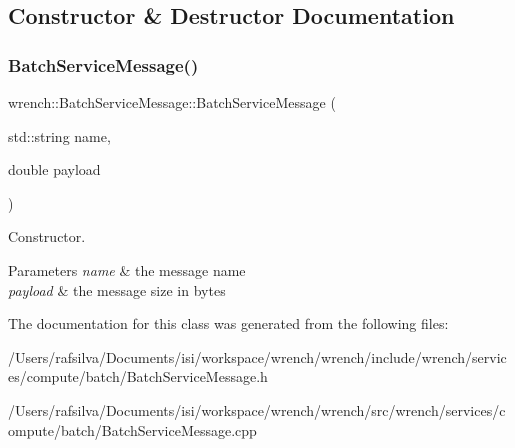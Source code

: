 \subsection{Constructor \& Destructor Documentation}
\mbox{\label{classwrench_1_1_batch_service_message_ab41ad2c88e84ccf1335f364fd3beb7c9}} 
\subsubsection{\texorpdfstring{Batch\+Service\+Message()}{BatchServiceMessage()}}
{\footnotesize\ttfamily wrench\+::\+Batch\+Service\+Message\+::\+Batch\+Service\+Message (\begin{DoxyParamCaption}\item[{std\+::string}]{name,  }\item[{double}]{payload }\end{DoxyParamCaption})\hspace{0.3cm}{\ttfamily [protected]}}



Constructor. 


\begin{DoxyParams}{Parameters}
{\em name} & the message name \\
\hline
{\em payload} & the message size in bytes \\
\hline
\end{DoxyParams}


The documentation for this class was generated from the following files\+:\begin{DoxyCompactItemize}
\item 
/\+Users/rafsilva/\+Documents/isi/workspace/wrench/wrench/include/wrench/services/compute/batch/Batch\+Service\+Message.\+h\item 
/\+Users/rafsilva/\+Documents/isi/workspace/wrench/wrench/src/wrench/services/compute/batch/Batch\+Service\+Message.\+cpp\end{DoxyCompactItemize}
